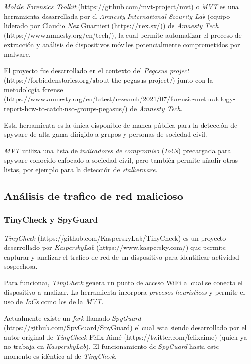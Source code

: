 \documentclass[12pt]{caltech_thesis}
\begin{document}
\textit{Mobile Forensics Toolkit} (https://github.com/mvt-project/mvt) o \textit{MVT} es una herramienta desarrollada por el \textit{Amnesty International Security Lab} (equipo liderado por Claudio \textit{Nex} Guarnieri (https://nex.sx/)) de \textit{Amnesty Tech} (https://www.amnesty.org/en/tech/), la cual permite automatizar el proceso de extracción y análisis de dispositivos móviles potencialmente comprometidos por malware.

El proyecto fue desarrollado en el contexto del \textit{Pegasus project} (https://forbiddenstories.org/about-the-pegasus-project/) junto con la metodología forense (https://www.amnesty.org/en/latest/research/2021/07/forensic-methodology-report-how-to-catch-nso-groups-pegasus/) de \textit{Amnesty Tech}.

Esta herramienta es la única disponible de manea pública para la detección de spyware de alta gama dirigido a grupos y personas de sociedad civil.

\textit{MVT} utiliza una lista de \textit{indicadores de compromiso} (\textit{IoCs}) precargada para spyware conocido enfocado a sociedad civil, pero también permite añadir otras listas, por ejemplo para la detección de \textit{stalkerware}.

\subsection{Análisis de trafico de red malicioso}

\subsubsection{TinyCheck y SpyGuard}

\textit{TinyCheck} (https://github.com/KasperskyLab/TinyCheck) es un proyecto desarrollado por \textit{KasperskyLab} (https://www.kaspersky.com/) que permite capturar y analizar el trafico de red de un dispositivo para identificar actividad sospechosa.

Para funcionar, \textit{TinyCheck} genera un punto de acceso WiFi al cual se conecta el dispositivo a analizar. La herramienta incorpora \textit{procesos heurísticos} y permite el uso de \textit{IoCs} como los de la \textit{MVT}.

Actualmente existe un \textit{fork} llamado \textit{SpyGuard} (https://github.com/SpyGuard/SpyGuard) el cual esta siendo desarrollado por el autor original de \textit{TinyCheck} Félix Aimé (https://twitter.com/felixaime) (quien ya no trabaja en \textit{KasperskyLab}). El funcionamiento de \textit{SpyGuard} hasta este momento es idéntico al de \textit{TinyCheck}.
\end{document}
